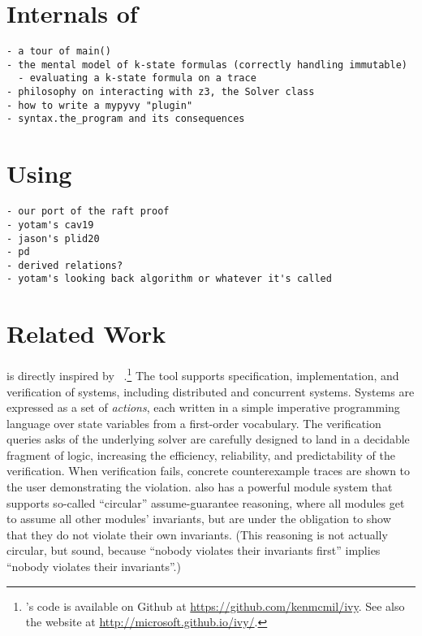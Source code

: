 \section{Internals of \mypyvy}

\begin{verbatim}
- a tour of main()
- the mental model of k-state formulas (correctly handling immutable)
  - evaluating a k-state formula on a trace
- philosophy on interacting with z3, the Solver class
- how to write a mypyvy "plugin"
- syntax.the_program and its consequences
\end{verbatim}

\section{Using \mypyvy}

\begin{verbatim}
- our port of the raft proof
- yotam's cav19
- jason's plid20
- pd
- derived relations?
- yotam's looking back algorithm or whatever it's called
\end{verbatim}

\section{Related Work}


\mypyvy is directly inspired by \ivy~\cite{Padon-al:PLDI16}.\footnote{
  \ivy's code is available on Github at \url{https://github.com/kenmcmil/ivy}.
  See also the \ivy website at \url{http://microsoft.github.io/ivy/}.
}
%
The \ivy tool supports specification, implementation, and verification of systems,
including distributed and concurrent systems.
%
Systems are expressed as a set of \emph{actions},
each written in a simple imperative programming language
over state variables from a first-order vocabulary.
%
The verification queries \ivy asks of the underlying solver
are carefully designed to land in a decidable fragment of logic,
increasing the efficiency, reliability, and predictability
of the verification.
%
When verification fails, concrete counterexample traces
are shown to the user demonstrating the violation.
%
\ivy{} also has a powerful module system
that supports so-called ``circular'' assume-guarantee reasoning,
where all modules get to assume all other modules' invariants,
but are under the obligation to show that they do not violate
their own invariants.
%
(This reasoning is not actually circular, but sound,
because ``nobody violates their invariants first''
implies ``nobody violates their invariants''.)

